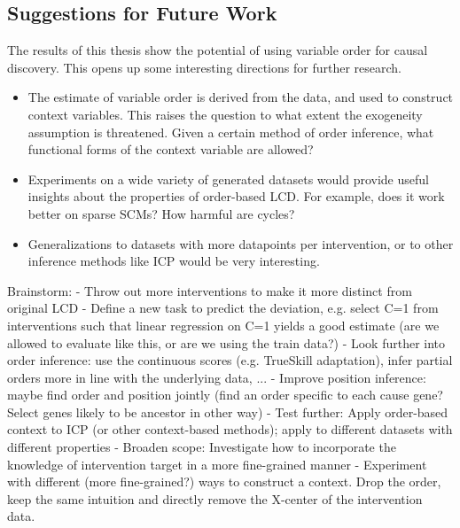 \subsection{Suggestions for Future Work}
The results of this thesis show the potential of using variable order for causal discovery. This opens up some interesting directions for further research.

\begin{itemize}
    \item The estimate of variable order is derived from the data, and used to construct context variables. This raises the question to what extent the exogeneity assumption is threatened. Given a certain method of order inference, what functional forms of the context variable are allowed?
    \item Experiments on a wide variety of generated datasets would provide useful insights about the properties of order-based LCD. For example, does it work better on sparse SCMs? How harmful are cycles?
    \item Generalizations to datasets with more datapoints per intervention, or to other inference methods like ICP would be very interesting. 
\end{itemize}

Brainstorm:
- Throw out more interventions to make it more distinct from original LCD
- Define a new task to predict the deviation, e.g. select C=1 from interventions such that linear regression on C=1 yields a good estimate (are we allowed to evaluate like this, or are we using the train data?)
- Look further into order inference: use the continuous scores (e.g. TrueSkill adaptation), infer partial orders more in line with the underlying data, ...
- Improve position inference: maybe find order and position jointly (find an order specific to each cause gene? Select genes likely to be ancestor in other way)
- Test further: Apply order-based context to ICP (or other context-based methods); apply to different datasets with different properties
- Broaden scope: Investigate how to incorporate the knowledge of intervention target in a more fine-grained manner
- Experiment with different (more fine-grained?) ways to construct a context. Drop the order, keep the same intuition and directly remove the X-center of the intervention data.


